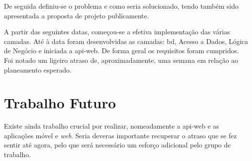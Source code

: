 De seguida definiu-se o problema e como seria solucionado, tendo também sido apresentada a proposta de projeto publicamente.

A partir das seguintes datas, começou-se a efetiva implementação das várias camadas. Até à data foram desenvolvidas as camadas: \acrlong{bd}, Acesso a Dados, Lógica de Negócio e iniciada a \gls{api-web}. De forma geral os requisitos foram cumpridos. Foi notado um ligeiro atraso de, aproximadamente, uma semana em relação ao planeamento esperado.

\section{Trabalho Futuro}\label{sec43}

Existe ainda trabalho crucial por realizar, nomeadamente a \gls{api-web} e as aplicações móvel e \textit{web}. Seria deveras importante recuperar o atraso que se fez sentir até agora, pelo que será necessário um esforço adicional pelo grupo de trabalho.